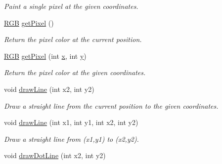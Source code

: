 \begin{DoxyCompactItemize}
\begin{DoxyCompactList}\small\item\em Paint a single pixel at the given coordinates. \end{DoxyCompactList}\item 
\hypertarget{classGUI_1_1Drawable_a1d74a05317ac725da786c76fe5788cb5}{\hyperlink{namespaceGUI_aeafd135255365f3584da0e982fc79466}{R\-G\-B} \hyperlink{classGUI_1_1Drawable_a1d74a05317ac725da786c76fe5788cb5}{get\-Pixel} ()}\label{classGUI_1_1Drawable_a1d74a05317ac725da786c76fe5788cb5}

\begin{DoxyCompactList}\small\item\em Return the pixel color at the current position. \end{DoxyCompactList}\item 
\hypertarget{classGUI_1_1Drawable_aa47df2365adb19c049cda5701b1baab9}{\hyperlink{namespaceGUI_aeafd135255365f3584da0e982fc79466}{R\-G\-B} \hyperlink{classGUI_1_1Drawable_aa47df2365adb19c049cda5701b1baab9}{get\-Pixel} (int \hyperlink{classGUI_1_1Drawable_a098294925bd310aa41080a2441790b80}{x}, int \hyperlink{classGUI_1_1Drawable_a574c99954cc268937f2c66ebe1332316}{y})}\label{classGUI_1_1Drawable_aa47df2365adb19c049cda5701b1baab9}

\begin{DoxyCompactList}\small\item\em Return the pixel color at the given coordinates. \end{DoxyCompactList}\item 
\hypertarget{classGUI_1_1Drawable_a24e229cffbe0f1763f096ce3d03016b8}{void \hyperlink{classGUI_1_1Drawable_a24e229cffbe0f1763f096ce3d03016b8}{draw\-Line} (int x2, int y2)}\label{classGUI_1_1Drawable_a24e229cffbe0f1763f096ce3d03016b8}

\begin{DoxyCompactList}\small\item\em Draw a straight line from the current position to the given coordinates. \end{DoxyCompactList}\item 
\hypertarget{classGUI_1_1Drawable_a580548bf9497c21e4591dcd12e99a8c2}{void \hyperlink{classGUI_1_1Drawable_a580548bf9497c21e4591dcd12e99a8c2}{draw\-Line} (int x1, int y1, int x2, int y2)}\label{classGUI_1_1Drawable_a580548bf9497c21e4591dcd12e99a8c2}

\begin{DoxyCompactList}\small\item\em Draw a straight line from ({\ttfamily x1},{\ttfamily y1}) to ({\ttfamily x2},{\ttfamily y2}). \end{DoxyCompactList}\item 
\hypertarget{classGUI_1_1Drawable_a763dd8e2a47afa301ae2471b0b858a0c}{void \hyperlink{classGUI_1_1Drawable_a763dd8e2a47afa301ae2471b0b858a0c}{draw\-Dot\-Line} (int x2, int y2)}\label{classGUI_1_1Drawable_a763dd8e2a47afa301ae2471b0b858a0c}


\end{DoxyCompactItemize}
